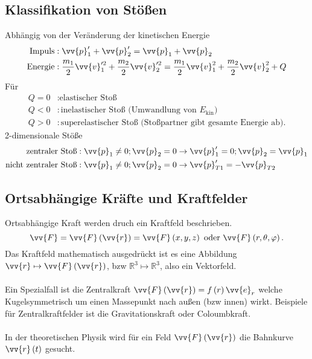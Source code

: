 \documentclass[a4paper,12pt]{article}
\numberwithin{equation}{section}
\begin{document}
\subsection{Klassifikation von Stößen}
Abhängig von der Veränderung der kinetischen Energie
\begin{align*}
        \text{Impuls}&:\vv{p}'_1+\vv{p}'_2=\vv{p}_1+\vv{p}_2\\
        \text{Energie}&:\dfrac{m_1}{2}\vv{v}'^2_1+\dfrac{m_2}{2}\vv{v}'^2_2=\dfrac{m_1}{2}\vv{v}^2_1+\dfrac{m_2}{2}\vv{v}^2_2+Q\\
\end{align*}
Für 
\begin{align*}
        Q=0&:\text{elastischer Stoß}\\
        Q<0&:\text{inelastischer Stoß (Umwandlung von $E_{\text{kin}}$)}\\
        Q>0&:\text{superelastischer Stoß (Stoßpartner gibt gesamte Energie ab)}
.\end{align*}
2-dimensionale Stöße
\begin{align*}
        \text{zentraler Stoß}&:\vv{p}_1\neq 0;\vv{p}_2=0\rightarrow \vv{p}'_1=0;\vv{p}_2=\vv{p}_1\\
        \text{nicht zentraler Stoß}&:\vv{p}_1\neq 0;\vv{p}_2=0\rightarrow \vv{p}'_{T1}=-\vv{p}_{T2}
\end{align*}

\subsection{Ortsabhängige Kräfte und Kraftfelder}
Ortsabhängige Kraft werden druch ein Kraftfeld beschrieben.
\[ 
        \vv{F}=\vv{F}\left(\vv{r}\right)=\vv{F}\left(x,y,z\right)\text{ oder }\vv{F}\left(r,\theta ,\varphi \right)
.\] 
Das Kraftfeld mathematisch ausgedrückt ist es eine Abbildung $\vv{r}\mapsto\vv{F}\left(\vv{r}\right)$, bzw $\mathbb{R}^{3}\mapsto\mathbb{R}^{3}$, also ein Vektorfeld.\\\\
Ein Spezialfall ist die Zentralkraft $\vv{F}\left(\vv{r}\right)=f\left(r\right)\vv{e}_r$ welche Kugelsymmetrisch um einen Massepunkt nach außen (bzw innen) wirkt. Beispiele für Zentralkraftfelder ist die Gravitationskraft oder Coloumbkraft.\\\\
In der theoretischen Physik wird für ein Feld $\vv{F}\left(\vv{r}\right)$ die Bahnkurve $\vv{r}\left(t\right)$ gesucht.
\end{document}
